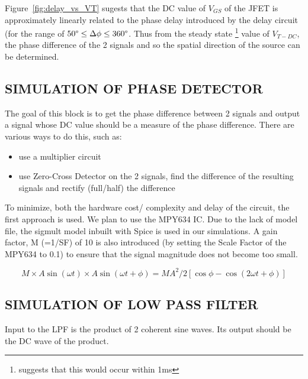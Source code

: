 \documentclass[]{risa}
\begin{document}
Figure~\ref{fig:delay_vs_VT}  sugests that the DC value of $V_{GS}$ of the JFET is approximately linearly related to the phase delay introduced by the delay circuit (for the range of $50\degree \leq \Delta \phi \leq 360\degree$. Thus from the steady state \footnote{\cite{1031521} suggests that this would occur within 1ms} value of $V_{T-DC}$, the phase difference of the 2 signals and so the spatial direction of the source can be determined.


\subsection{SIMULATION OF PHASE DETECTOR}
The goal of this block is to get the phase difference  between 2 signals and output a signal whose DC value should be a measure of the phase difference. There are various ways to do this, such as:
\begin{itemize}
    \item use a multiplier circuit
    \item use Zero-Cross Detector on the 2 signals, find the difference of the resulting signals and rectify (full/half) the difference 
\end{itemize}
To minimize, both the hardware cost/ complexity and delay of the circuit, the first approach is used. We plan to use the MPY634 IC. Due to the lack of model file, the sigmult model inbuilt with Spice is used in our simulations.
A gain factor, M (=1/SF) of 10 is also introduced (by setting the Scale Factor of the MPY634 to 0.1) to ensure that the signal magnitude does not become too small.

\begin{equation*}
   M\times A\sin{(\omega t)}\times A\sin{(\omega t +\phi)}=MA^2/2[\cos{\phi} - \cos{(2\omega t + \phi)}]
\end{equation*}
 
\subsection{SIMULATION OF LOW PASS FILTER}
Input to the LPF is the product of 2 coherent sine waves. Its output should be the DC wave of the product.
\end{document}
